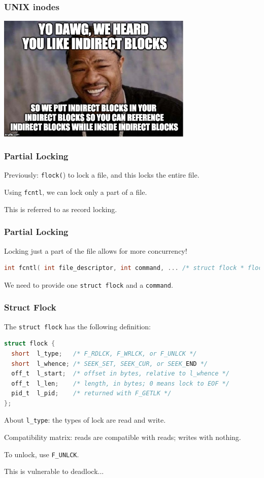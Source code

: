 \begin{frame}
	\frametitle{UNIX inodes}

	\begin{center}
		\includegraphics[width=0.7\textwidth]{images/yodawg.jpg}
	\end{center}

\end{frame}


\begin{frame}
	\frametitle{Partial Locking}

	Previously: \texttt{flock(}) to lock a file, and this locks the entire file.

	Using \texttt{fcntl}, we can lock only a part of a file.

	This is referred to as \alert{record locking}.

\end{frame}


\begin{frame}[fragile]
	\frametitle{Partial Locking}

	Locking just a part of the file allows for more concurrency!

	\begin{lstlisting}[language=C]
int fcntl( int file_descriptor, int command, ... /* struct flock * flockptr */ )
\end{lstlisting}

	We need to provide one \texttt{struct flock} and a \texttt{command}.


\end{frame}


\begin{frame}[fragile]
	\frametitle{Struct Flock}

	The \texttt{struct flock} has the following definition:
	\begin{lstlisting}[language=C]
struct flock {
  short  l_type;   /* F_RDLCK, F_WRLCK, or F_UNLCK */
  short  l_whence; /* SEEK_SET, SEEK_CUR, or SEEK_END */
  off_t  l_start;  /* offset in bytes, relative to l_whence */
  off_t  l_len;    /* length, in bytes; 0 means lock to EOF */
  pid_t  l_pid;    /* returned with F_GETLK */
};
\end{lstlisting}

	About \texttt{l\_type}: the types of lock are read and write.

	Compatibility matrix: reads are compatible with reads; writes with nothing.

	To unlock, use \texttt{F\_UNLCK}.

	This is vulnerable to deadlock...

\end{frame}

